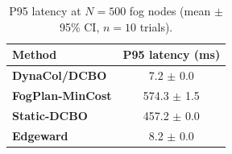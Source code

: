 \begin{table}[!t]
\centering
\caption{P95 latency at $N=500$ fog nodes (mean $\pm$ 95\% CI, $n=10$ trials).}
\label{tab:p95_sla_node}
\fgcsTableCol
\begin{tabular*}{\columnwidth}{@{\extracolsep{\fill}}lc@{}}
\toprule
\textbf{Method} & \textbf{P95 latency (ms)} \\
\midrule
\textcolor{dynacolBlue}{\textbf{DynaCol/DCBO}} & 7.2 $\pm$ 0.0 \\
\textcolor{dynacolOrange}{\textbf{FogPlan-MinCost}} & 574.3 $\pm$ 1.5 \\
\textcolor{dynacolTeal}{\textbf{Static-DCBO}} & 457.2 $\pm$ 0.0 \\
\textcolor{dynacolPurple}{\textbf{Edgeward}} & 8.2 $\pm$ 0.0 \\
\bottomrule
\end{tabular*}
\end{table}